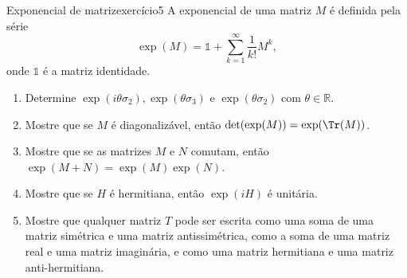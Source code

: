 \begin{exercício}{Exponencial de matriz}{exercício5}
    A exponencial de uma matriz \(M\) é definida pela série
    \begin{equation*}
        \exp(M) = \mathds{1} + \sum_{k = 1}^{\infty} \frac{1}{k!} M^{k},
    \end{equation*}
    onde \(\mathds{1}\) é a matriz identidade.
    \begin{enumerate}[label=(\alph*)]
        \item Determine \(\exp(i\theta \sigma_2), \exp(\theta \sigma_3)\) e \(\exp(\theta \sigma_2)\) com \(\theta \in \mathbb{R}\).
        \item Mostre que se \(M\) é diagonalizável, então \(\det(\exp(M)) = \exp(\Tr(M))\).
        \item Mostre que se as matrizes \(M\) e \(N\) comutam, então \(\exp(M+N) = \exp(M)\exp(N)\).
        \item Mostre que se \(H\) é hermitiana, então \(\exp(iH)\) é unitária.
        \item Mostre que qualquer matriz \(T\) pode ser escrita como uma soma de uma matriz simétrica e uma matriz antissimétrica, como a soma de uma matriz real e uma matriz imaginária, e como uma matriz hermitiana e uma matriz anti-hermitiana.
    \end{enumerate}
\end{exercício}
